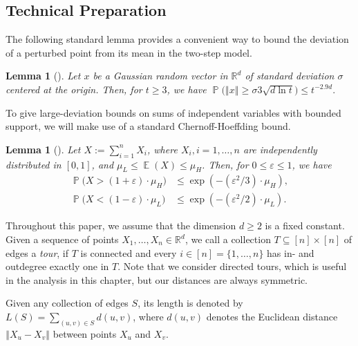 \documentclass[11pt,DIV=12,a4paper]{scrartcl}
\newtheorem{lemma}[claim]{Lemma}
\newcommand{\real}{\ensuremath{\mathbb{R}}}
\DeclareMathOperator{\probab}{\mathbb{P}}
\DeclareMathOperator{\expected}{\mathbb{E}}
\newcommand{\norm}[1]{\left\Vert #1 \right\Vert}
\begin{document}
\subsection{Technical Preparation}

The following standard lemma provides a convenient way to bound the deviation of a perturbed point from its mean in the two-step model.

\begin{lemma}[]\label{lem:chisquare}
Let $x$ be a Gaussian random vector in $\real^d$ of standard deviation $\sigma$ centered at the origin. Then, for $t\ge 3$, we have
 $\probab\bigl(\norm{x} \ge \sigma 3\sqrt{d\ln t}\bigr) \le t^{-2.9d}.$
\end{lemma}


To give large-deviation bounds on sums of independent variables with bounded support, we will make use of a standard Chernoff-Hoeffding bound.
\begin{lemma}[]\label{lem:chernoff}
Let $X := \sum_{i=1}^n X_i$, where $X_i, i=1,\dots,n$ are independently distributed in $[0,1]$, and $\mu_L \le \expected(X)\le \mu_H$. Then, for $0\le \varepsilon \le 1$, we have
\begin{align*}
 \probab\bigl(X > (1+\varepsilon) \cdot \mu_H \bigr) & \le \exp(-(\varepsilon^2/3) \cdot \mu_H),\\
 \probab\bigl(X < (1-\varepsilon) \cdot \mu_L \bigr) & \le \exp(-(\varepsilon^2/2) \cdot \mu_L).
\end{align*}
\end{lemma}




Throughout this paper, we assume that the dimension $d\ge 2$ is a fixed constant. Given a sequence of points $X_1,\dots,X_n \in \real^d$, we call a collection $T\subseteq [n]\times [n]$ of edges a \emph{tour}, if $T$ is connected and every $i\in[n] = \{1, \ldots, n\}$
has in- and outdegree exactly one in $T$. Note that we consider directed tours, which is useful in the analysis in this chapter,
but our distances are always symmetric.

Given any collection of edges $S$, its length is denoted by $L(S) = \sum_{(u,v)\in S} d(u,v)$, where $d(u,v)$ denotes
the Euclidean distance $\norm{X_u - X_v}$ between points $X_u$ and $X_v$.
\end{document}

